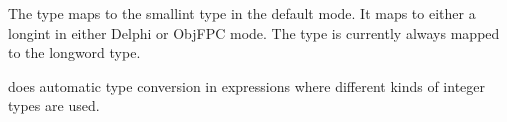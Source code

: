 The  type maps to the smallint type in the default
\fpc mode. It maps to either a longint in either Delphi or ObjFPC
mode. The  type is currently always mapped to the 
longword type. 




\fpc does automatic type conversion in expressions where different kinds of
integer types are used.
% 
%

